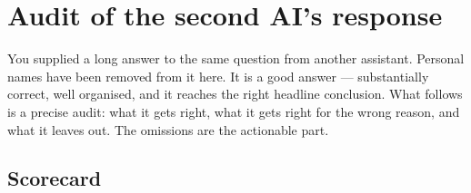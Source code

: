 \renewcommand{\sectioncolor}{nano}
\section{Audit of the second AI's response}

You supplied a long answer to the same question from another assistant. Personal names have been
removed from it here. It is a good answer --- substantially correct, well organised, and it reaches
the right headline conclusion. What follows is a precise audit: what it gets right, what it gets
right for the wrong reason, and what it leaves out. The omissions are the actionable part.

\subsection{Scorecard}

